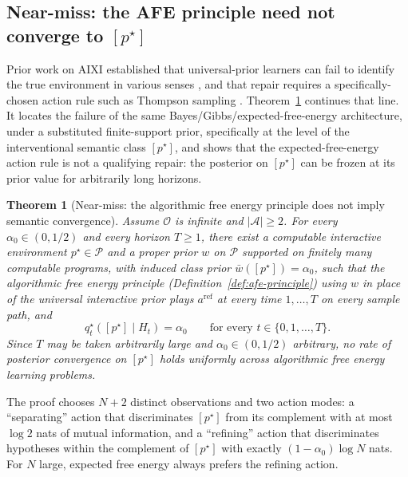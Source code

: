 \documentclass[11pt]{article}
\newtheorem{theorem}{Theorem}[section]
\theoremstyle{definition}
\theoremstyle{remark}
\newcommand{\Acal}{\mathcal{A}}
\newcommand{\Ocal}{\mathcal{O}}
\newcommand{\Pcal}{\mathcal{P}}
\begin{document}
\subsection{Near-miss: the AFE principle need not converge to $[p^\star]$}

Prior work on AIXI established that universal-prior learners can fail to identify the true environment in various senses \citep{LeikeHutter2015,Leike2016}, and that repair requires a specifically-chosen action rule such as Thompson sampling \citep{LeikeEtAl2016}. Theorem~\ref{thm:afe-near-miss} continues that line. It locates the failure of the same Bayes/Gibbs/expected-free-energy architecture, under a substituted finite-support prior, specifically at the level of the interventional semantic class $[p^\star]$, and shows that the expected-free-energy action rule is not a qualifying repair: the posterior on $[p^\star]$ can be frozen at its prior value for arbitrarily long horizons.

\begin{theorem}[Near-miss: the algorithmic free energy principle does not imply semantic convergence]
\label{thm:afe-near-miss}
Assume $\Ocal$ is infinite and $|\Acal|\ge 2$. For every $\alpha_0\in(0,1/2)$ and every horizon $T\ge 1$, there exist a computable interactive environment $p^\star\in\Pcal$ and a proper prior $w$ on $\Pcal$ supported on finitely many computable programs, with induced class prior $\bar w([p^\star])=\alpha_0$, such that the algorithmic free energy principle (Definition~\ref{def:afe-principle}) using $w$ in place of the universal interactive prior plays $a^{\mathrm{ref}}$ at every time $1,\dots,T$ on every sample path, and
\[
q_t^\star([p^\star]\mid H_t)=\alpha_0
\qquad\text{for every }t\in\{0,1,\dots,T\}.
\]
Since $T$ may be taken arbitrarily large and $\alpha_0\in(0,1/2)$ arbitrary, no rate of posterior convergence on $[p^\star]$ holds uniformly across algorithmic free energy learning problems.
\end{theorem}

The proof chooses $N+2$ distinct observations and two action modes: a ``separating'' action that discriminates $[p^\star]$ from its complement with at most $\log 2$ nats of mutual information, and a ``refining'' action that discriminates hypotheses within the complement of $[p^\star]$ with exactly $(1-\alpha_0)\log N$ nats. For $N$ large, expected free energy always prefers the refining action.
\end{document}
